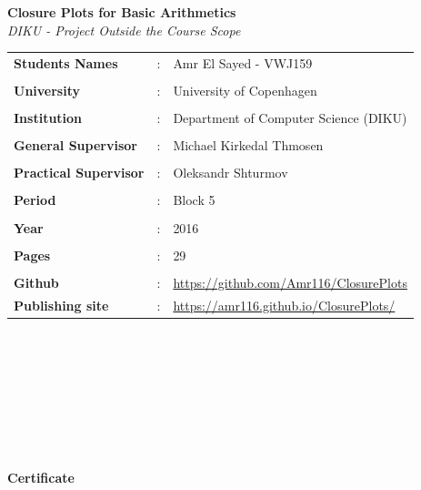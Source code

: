 \documentclass[11pt]{article}
\begin{document}
\clearpage\maketitle
\thispagestyle{empty}
\newpage
\begin{center}{\huge\textbf{Closure Plots for Basic Arithmetics}}\newline \textit{\\DIKU - Project Outside the Course Scope}\end{center}
\hfill \break
\begin{tabular}{l l l }
\textbf{Students Names} &: &Amr El Sayed - VWJ159\\\\
\textbf{University} &:& University of Copenhagen\\\\
\textbf{Institution} &:& Department of Computer Science (DIKU)\\\\
\textbf{General Supervisor} &:& Michael Kirkedal Thmosen\\\\
\textbf{Practical Supervisor} &:& Oleksandr Shturmov\\\\
\textbf{Period} &:& Block 5\\\\
\textbf{Year} &:& 2016\\\\
\textbf{Pages} &:& 29\\\\
\textbf{Github} &:& \url{https://github.com/Amr116/ClosurePlots}\\
\textbf{Publishing site} &:& \url{https://amr116.github.io/ClosurePlots/}
\end{tabular}
\\\\\\\\\\\\\\
\begin{center}{\huge\textbf{Certificate}}\end{center}
\end{document}
